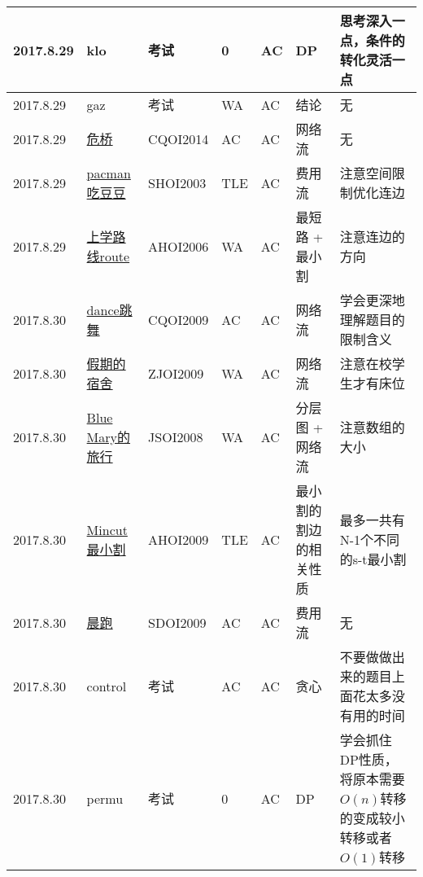 \documentclass[a4paper]{article}
\begin{document}
\begin{longtable}{|p{1.5cm}|p{2.5cm}|p{1.6cm}|p{1.6cm}|p{1cm}|p{3cm}|p{4cm}|}
		\hline
		2017.8.29 & klo
		 & 考试 & 0 & AC & DP & 思考深入一点，条件的转化灵活一点\\
		
		\hline
		2017.8.29 & gaz
		 & 考试 & WA & AC & 结论 & 无\\
		
		\hline
		2017.8.29 & \href {http://www.lydsy.com/JudgeOnline/problem.php?id=3504}{危桥}
		 & CQOI2014 & AC & AC & 网络流 & 无\\
		
		\hline
		2017.8.29 & \href {http://www.lydsy.com/JudgeOnline/problem.php?id=1930}{pacman 吃豆豆}
		 & SHOI2003 & TLE & AC & 费用流 & 注意空间限制优化连边\\
		
		\hline
		2017.8.29 & \href {http://www.lydsy.com/JudgeOnline/problem.php?id=1266}{上学路线route}
		 & AHOI2006 & WA & AC & 最短路 + 最小割 & 注意连边的方向\\
		
		\hline
		2017.8.30 & \href {http://www.lydsy.com/JudgeOnline/problem.php?id=1305}{dance跳舞}
		 & CQOI2009 & AC & AC & 网络流 & 学会更深地理解题目的限制含义\\
		
		\hline
		2017.8.30 & \href {http://www.lydsy.com/JudgeOnline/problem.php?id=1433}{假期的宿舍}
		 & ZJOI2009 & WA & AC & 网络流 & 注意在校学生才有床位\\
		
		\hline
		2017.8.30 & \href {http://www.lydsy.com/JudgeOnline/problem.php?id=1570}{Blue Mary的旅行}
		 & JSOI2008 & WA & AC & 分层图 + 网络流 & 注意数组的大小\\
		
		\hline
		2017.8.30 & \href {http://www.lydsy.com/JudgeOnline/problem.php?id=1797}{Mincut 最小割}
		 & AHOI2009 & TLE & AC & 最小割的割边的相关性质 & 最多一共有N-1个不同的s-t最小割\\
		
		\hline
		2017.8.30 & \href {http://www.lydsy.com/JudgeOnline/problem.php?id=1877}{晨跑}
		 & SDOI2009 & AC & AC & 费用流 & 无\\
		
		\hline
		2017.8.30 & control
		 & 考试 & AC & AC & 贪心 & 不要做做出来的题目上面花太多没有用的时间\\
		
		\hline
		2017.8.30 & permu
		 & 考试 & 0 & AC & DP & 学会抓住DP性质，将原本需要$O(n)$转移的变成较小转移或者$O(1)$转移\\
		

\end{longtable}
\end{document}
